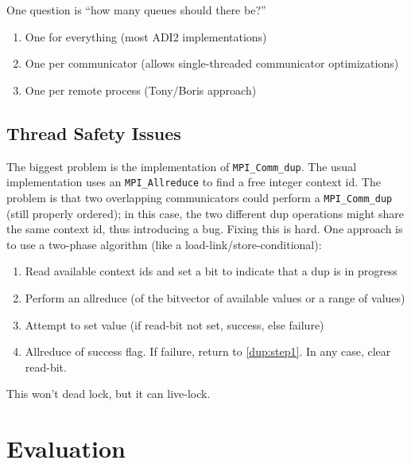 \documentclass{article}
\begin{document}
One question is ``how many queues should there be?''  

\begin{enumerate}
\item One for everything (most ADI2 implementations)
\item One per communicator (allows single-threaded communicator optimizations)
\item One per remote process (Tony/Boris approach)
\end{enumerate}

\subsection{Thread Safety Issues}
The biggest problem is the implementation of \texttt{MPI\_Comm\_dup}.  The
usual implementation uses an \texttt{MPI\_Allreduce} to find a free integer
context id.  The problem is that two overlapping communicators could perform a
\texttt{MPI\_Comm\_dup} (still properly ordered); in this case, the two
different dup operations might share the same context id, thus introducing a
bug.  Fixing this is hard.  One approach is to use a two-phase algorithm (like
a load-link/store-conditional):
\begin{enumerate}
\item Read available context ids and set a bit to indicate that a dup is in
  progress\label{dup:step1}
\item Perform an allreduce (of the bitvector of available values or a range of
  values)
\item Attempt to set value (if read-bit not set, success, else failure)
\item Allreduce of success flag.  If failure, return to \ref{dup:step1}.
In any case, clear read-bit.
\end{enumerate}
This won't dead lock, but it can live-lock.  
\section{Evaluation}



\end{document}
